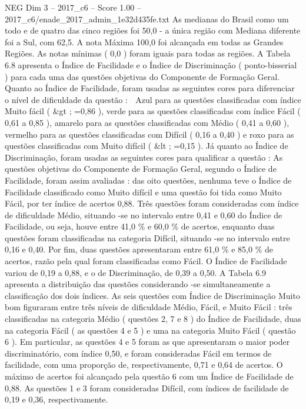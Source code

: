 \begin{textsample}{NEG Dim 3 – 2017\_c6 – Score 1.00 – 2017\_c6/enade\_2017\_admin\_1e32d435fe.txt}
As medianas do Brasil como um todo e de quatro das cinco regiões foi 50,0 - a única região com Mediana diferente foi a Sul, com 62,5.
A nota Máxima 100,0 foi alcançada em todas as Grandes Regiões.
As notas mínimas ( 0,0 ) foram iguais para todas as regiões.
A Tabela 6.8 apresenta o Índice de Facilidade e o Índice de Discriminação ( ponto-bisserial ) para cada uma das questões objetivas do Componente de Formação Geral.
Quanto ao Índice de Facilidade, foram usadas as seguintes cores para diferenciar o nível de dificuldade da questão :  Azul para as questões classificadas com índice Muito fácil ( \&gt ; =0,86 ), verde para as questões classificadas com índice Fácil ( 0,61 a 0,85 ), amarelo para as questões classificadas com Médio ( 0,41 a 0,60 ), vermelho para as questões classificadas com Difícil ( 0,16 a 0,40 ) e roxo para as questões classificadas com Muito difícil ( \&lt ; =0,15 ).
Já quanto ao Índice de Discriminação, foram usadas as seguintes cores para qualificar a questão : As questões objetivas do Componente de Formação Geral, segundo o Índice de Facilidade, foram assim avaliadas : das oito questões, nenhuma teve o Índice de Facilidade classificado como Muito difícil e uma questão foi tida como Muito Fácil, por ter índice de acertos 0,88.
Três questões foram consideradas com índice de dificuldade Médio, situando -se no intervalo entre 0,41 e 0,60 do Índice de Facilidade, ou seja, houve entre 41,0 \% e 60,0 \% de acertos, enquanto duas questões foram classificadas na categoria Difícil, situando -se no intervalo entre 0,16 e 0,40.
Por fim, duas questões apresentaram entre 61,0 \% e 85,0 \% de acertos, razão pela qual foram classificadas como Fácil.
O Índice de Facilidade variou de 0,19 a 0,88, e o de Discriminação, de 0,39 a 0,50.
A Tabela 6.9 apresenta a distribuição das questões considerando -se simultaneamente a classificação dos dois índices.
As seis questões com Índice de Discriminação Muito bom figuraram entre três níveis de dificuldade Médio, Fácil, e Muito Fácil : três classificadas na categoria Médio ( questões 2, 7 e 8 ) do Índice de Facilidade, duas na categoria Fácil ( as questões 4 e 5 ) e uma na categoria Muito Fácil ( questão 6 ).
Em particular, as questões 4 e 5 foram as que apresentaram o maior poder discriminatório, com índice 0,50, e foram consideradas Fácil em termos de facilidade, com uma proporção de, respectivamente, 0,71 e 0,64 de acertos.
O máximo de acertos foi alcançado pela questão 6 com um Índice de Facilidade de 0,88.
As questões 1 e 3 foram consideradas Difícil, com índices de facilidade de 0,19 e 0,36, respectivamente.

\end{textsample}
